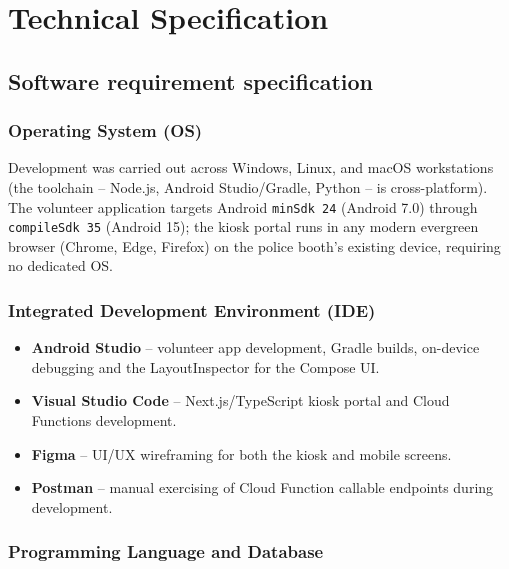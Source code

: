 \documentclass[12pt,a4paper,oneside]{report}
\newcommand{\code}[1]{\texttt{#1}}
\begin{document}
\chapter{Technical Specification}

\section{Software requirement specification}

\subsection{Operating System (OS)}
Development was carried out across Windows, Linux, and macOS workstations
(the toolchain -- Node.js, Android Studio/Gradle, Python -- is
cross-platform). The volunteer application targets Android \code{minSdk 24}
(Android 7.0) through \code{compileSdk 35} (Android 15); the kiosk portal
runs in any modern evergreen browser (Chrome, Edge, Firefox) on the police
booth's existing device, requiring no dedicated OS.

\subsection{Integrated Development Environment (IDE)}
\begin{itemize}
  \item \textbf{Android Studio} -- volunteer app development, Gradle
        builds, on-device debugging and the LayoutInspector for the
        Compose UI.
  \item \textbf{Visual Studio Code} -- Next.js/TypeScript kiosk portal and
        Cloud Functions development.
  \item \textbf{Figma} -- UI/UX wireframing for both the kiosk and mobile
        screens.
  \item \textbf{Postman} -- manual exercising of Cloud Function callable
        endpoints during development.
\end{itemize}

\subsection{Programming Language and Database}
\end{document}
